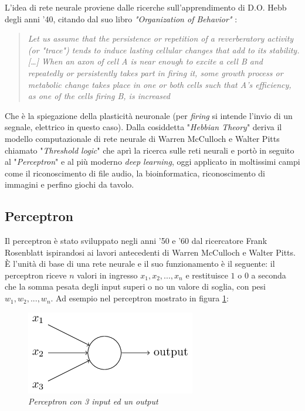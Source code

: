\documentclass[12pt,a4paper]{report}
\begin{document}
L'idea di rete neurale proviene dalle ricerche sull'apprendimento di D.O. Hebb degli anni '40, citando dal suo libro \textit{"Organization of Behavior"} \cite{hebb-learning}:

\begin{quote}
 \begin{center}
  \textit{Let us assume that the persistence or repetition of a reverberatory activity (or "trace") tends to induce lasting cellular changes that add to its stability.[…] When an axon of cell A is near enough to excite a cell B and repeatedly or persistently takes part in firing it, some growth process or metabolic change takes place in one or both cells such that A's efficiency, as one of the cells firing B, is increased}
 \end{center}
\end{quote} 

Che è la spiegazione della plasticità neuronale (per \textit{firing} si intende l'invio di un segnale, elettrico in questo caso).
Dalla cosiddetta "\textit{Hebbian Theory}" deriva il modello computazionale di rete neurale di  Warren McCulloch e Walter Pitts chiamato "\textit{Threshold logic}" che aprì la ricerca sulle reti neurali e portò in seguito al "\textit{Perceptron}" e al più moderno \textit{deep learning}, oggi applicato in moltissimi campi come il riconoscimento di file audio, la bioinformatica, riconoscimento di immagini e perfino giochi da tavolo.

\subsection{Perceptron}

\cite{neural-net-nielsen}
Il perceptron è stato sviluppato negli anni '50 e '60 dal ricercatore Frank Rosenblatt ispirandosi ai lavori antecedenti di Warren McCulloch e Walter Pitts.
È l'unità di base di una rete neurale e il suo funzionamento è il seguente:
il perceptron riceve $n$ valori in ingresso $x_{1},x_{2},...,x_{n}$ e restituisce $1$ o $0$ a seconda che la somma pesata degli input superi o no un valore di soglia, con pesi $w_{1},w_{2},...,w_{n}$.
Ad esempio nel perceptron mostrato in figura \ref{perceptron}:

\begin{figure}[H]
 \centering
 \includegraphics[scale = 0.7]{images/perceptron.png}
 \caption{\textit{Perceptron con 3 input ed un output}}
 \label{perceptron}
\end{figure}
\end{document}
